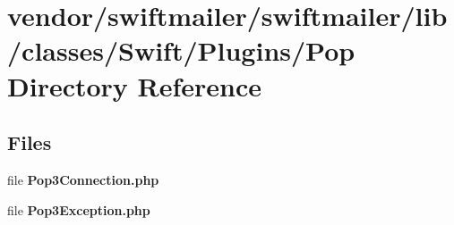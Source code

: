 \section{vendor/swiftmailer/swiftmailer/lib/classes/\+Swift/\+Plugins/\+Pop Directory Reference}
\label{dir_f8aa07c0b1af7557379cc97a5947259d}
\subsection*{Files}
\begin{DoxyCompactItemize}
\item 
file {\bf Pop3\+Connection.\+php}
\item 
file {\bf Pop3\+Exception.\+php}
\end{DoxyCompactItemize}

